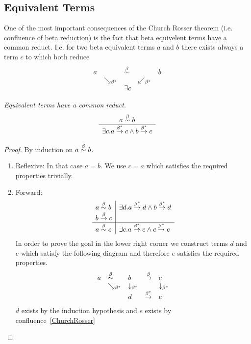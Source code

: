 \subsection{Equivalent Terms}

One of the most important consequences of the Church Rosser theorem (i.e.
confluence of beta reduction) is the fact that beta equivelent terms have a
common reduct. I.e. for two beta equivalent terms $a$ and $b$ there exists
always a term $c$ to which both reduce
$$
    \begin{array}{lllll}
    a & & \stackrel{\beta}{\sim} & & b
    \\
    &\searrow_{\beta^*}
    &
    &\swarrow_{\beta^*}
    \\
    & & \exists c
    \end{array}
$$

\begin{theorem}
    \label{BetaEquivalentCommonReduct}
    \emph{Equivalent terms have a common reduct}.
    $$
    \begin{array}{c} 
        a \stackrel{\beta}{\sim} b
     \\ \hline 
        \exists c. a \stackrel{\beta^*}{\to} c \land b \stackrel{\beta^*}{\to} c
    \end{array}
    $$

    \begin{proof}
        By induction on $a \stackrel{\beta}{\sim} b$.
        \begin{enumerate}
            \item Reflexive: In that case $a = b$. We use $c = a$ which satisfies
            the required properties trivially.

            \item Forward:
            $$
            \begin{array}{l|l}
                a \stackrel{\beta}{\sim} b
                &
                \exists d. a \stackrel{\beta^*}{\to} d \land b \stackrel{\beta^*}{\to} d
                \\
                b \stackrel{\beta}{\to} c
                \\
                \hline
                a \stackrel{\beta}{\sim} c
                &
                \exists e. a \stackrel{\beta^*}{\to} e \land c \stackrel{\beta^*}{\to} e
            \end{array}
            $$
            In order to prove the goal in the lower right corner we construct
            terms $d$ and $e$ which satisfy the following diagram and therefore
            $e$ satisfies the required properties.
            $$
            \begin{array}{lllll}
                a
                &\stackrel{\beta}{\sim}
                &b
                &\stackrel{\beta}{\to}
                &c
                \\
                &\searrow_{\beta^*}
                &\downarrow_{\beta^*}
                &
                &\downarrow_{\beta^*}
                \\
                &
                &d
                &\stackrel{\beta^*}{\to}
                &e
            \end{array}
            $$
            $d$ exists by the induction hypothesis and $e$ exists by
            confluence~\ref{ChurchRosser}


\end{enumerate}
\end{proof}
\end{theorem}
